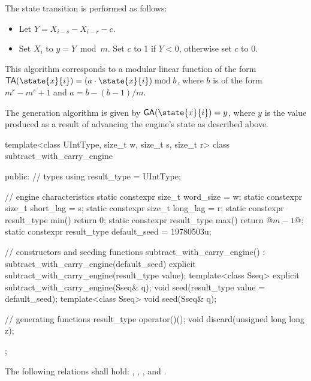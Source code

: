 \pnum
The state transition%
%
is performed as follows:
\begin{itemize}
 \item
   Let $Y = X_{i-s} - X_{i-r} - c$.
 \item
   Set $X_i$ to $y = Y \bmod m$.
   Set $c$ to 1 if $Y < 0$,
   otherwise set $c$ to 0.
\end{itemize}
\begin{note}
 This algorithm corresponds
 to a modular linear function
 of the form
 $\mathsf{TA}(\state{x}{i}) = (a \cdot \state{x}{i}) \bmod b$,
 where $b$ is of the form
 $m^r - m^s + 1$
 and $a = b - (b - 1) / m$.
\end{note}

\pnum
The generation algorithm%
%
is given by $\mathsf{GA}(\state{x}{i}) = y$,
where $y$ is the value produced as a result
of advancing the engine's state as described above.

%
%
\begin{codeblock}
template<class UIntType, size_t w, size_t s, size_t r>
  class subtract_with_carry_engine {
  public:
    // types
    using result_type = UIntType;

    // engine characteristics
    static constexpr size_t word_size = w;
    static constexpr size_t short_lag = s;
    static constexpr size_t long_lag = r;
    static constexpr result_type min() { return 0; }
    static constexpr result_type max() { return @$m - 1$@; }
    static constexpr result_type default_seed = 19780503u;

    // constructors and seeding functions
    subtract_with_carry_engine() : subtract_with_carry_engine(default_seed) {}
    explicit subtract_with_carry_engine(result_type value);
    template<class Sseq> explicit subtract_with_carry_engine(Sseq& q);
    void seed(result_type value = default_seed);
    template<class Sseq> void seed(Sseq& q);

    // generating functions
    result_type operator()();
    void discard(unsigned long long z);
  };
\end{codeblock}

\pnum
The following relations shall hold:
  ,
  ,
  ,
and
  .


